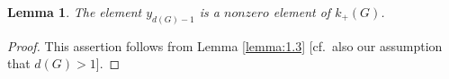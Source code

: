 \documentclass[12pt,showkeys]{amsart}
\theoremstyle{theorem}
\newtheorem{lem}[theorem]{Lemma}
\theoremstyle{definition}
\def\bQ{{\mathbb Q}}
\def\CalO{{\mathcal O}}
\def\Ker{{\mbox{Ker}}}
\begin{document}
\begin{lem}\label{lemma:1.4} 
The element $y_{d(G)-1}$ is a $nonzero$ element of $k_{+}(G)$. 
\end{lem}
\begin{proof} 
This assertion follows from Lemma \ref{lemma:1.3} [cf.\ also our assumption that $d(G) > 1$]. 
\begin{comment}
From the relation (\ref{lemma:1.3:eq:1}) in the proof of Lemma \ref{lemma:1.3}, $y_0$ and $y_1$ are linearly dependent. Suppose that $y_{d-1} = 0$. Since $y_0$ and $y_1$ are linearly dependent and $y_{d-1} = 0$, the dimension of the subspace spanned by $y_0, \dots, y_d$ is less than $(d+1)-2 = d-1$. From Lemma \ref{lemma:1.3} and the previous discussion, the dimension of $k_+(G)$ is less than $d-1$. This contradicts Lemma \ref{lemma:1.2}. 
First, we assume that $y_{d(G)-1} = 0$ and $d(G) = 2$. Since $\Ker(\CalO^{\times}(G) \rightarrow k_{+}(G)) = \CalO^{\prec 1}(G)_{\rm tor}$ [cf. \cite{Hoshi1}, Lemma 1.2, (v)], we conclude from the assumption that $y_{d(G) - 1} = 0$ that $x_{d(G)-1} \in \CalO^{\prec 1}(G)_{\rm tor}$. Thus, $z_{d(G)-1} = z_1$ is the identity element. In paticular, it follows from the condition of ${\{z_i\} }_{i \in S}$ [cf. Lemma \ref{lemma:1.3}] that $z_0$ is the identity element. Thus, $y_2$ is the only nontrivial element of ${\{y_i\} }_{i \in S}$. However this contradicts the fact that $k_{+}(G)$ is a $\bQ_{p(G)}$-vector space of dimension 2 [cf. \cite{Hoshi1}, Proposition 3.11, (iv)]. 
Next, we assume that $y_{d(G)-1} = 0$ and $d(G) > 2$. Since $y_0$ and $y_1$ are linearly dependent [cf. the relation (\ref{lemma:1.3:eq:1}) in the proof of Lemma \ref{lemma:1.3}], and $y_{d(G)-1} = 0$, the number of linearly independent elements of ${\{y_i\} }_{i \in S}$ is less than $d(G)-1$. It contradicts the fact that $k_{+}(G)$ is a $\bQ_{p(G)}$-vector space of dimension $d(G)$ [cf. \cite{Hoshi1}, Proposition 3.11, (iv)]. Since $y_{d(G)-1} = 0$, together with Lemma \ref{lemma:1.3}, ${\{y_i\} }_{i \in S \backslash (d(G)-1)}$ is a basis of the $\bQ_{p(G)}$-vector space $k_{+}(G)$. However, since $y_0$ and $y_1$ are linearly dependent [cf. the relation (\ref{lemma:1.3:eq:1}) in the proof of Lemma \ref{lemma:1.3}], ${\{y_i\} }_{i \in S \backslash (d(G)-1)}$ is not a basis of the $\bQ_{p(G)}$-vector space $k_{+}(G)$. This is cleary a contradiction.  
\end{comment}
\end{proof}
\end{document}
